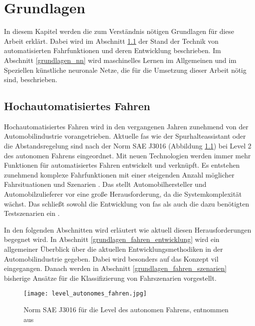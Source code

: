 
\chapter{Grundlagen}
\label{grundlagen}

In diesem Kapitel werden die zum Verständnis nötigen Grundlagen für diese Arbeit erklärt. Dabei wird im Abschnitt \ref{grundlagen_fahren} der Stand der Technik von automatisierten Fahrfunktionen und deren Entwicklung beschrieben. Im Abschnitt \ref{grundlagen_nn} wird maschinelles Lernen im Allgemeinen und im Speziellen künstliche neuronale Netze, die für die Umsetzung dieser Arbeit nötig sind, beschrieben.


\section{Hochautomatisiertes Fahren}
\label{grundlagen_fahren}

Hochautomatisiertes Fahren wird in den vergangenen Jahren zunehmend von der Automobilindustrie vorangetrieben. Aktuelle \gls{fas} wie der Spurhalteassistant oder die Abstandsregelung sind nach der Norm SAE J3016 (Abbildung \ref{fig_level_autonomes_fahren}) bei Level 2 des autonomen Fahrens eingeordnet. Mit neuen Technologien werden immer mehr Funktionen für automatisiertes Fahren entwickelt und verknüpft. Es entstehen zunehmend komplexe Fahrfunktionen mit einer steigenden Anzahl möglicher Fahrsituationen und Szenarien \cite{king2017identification}. Das stellt Automobilhersteller und Automobilzulieferer vor eine große Herausforderung, da die Systemkomplexität wächst. Das schließt sowohl die Entwicklung von \gls{fas} als auch die dazu benötigten Testszenarien ein \cite{pfeffer2016continuous}.

In den folgenden Abschnitten wird erläutert wie aktuell diesen Herausforderungen begegnet wird. In Abschnitt \ref{grundlagen_fahren_entwicklung} wird ein allgemeiner Überblick über die aktuellen Entwicklungsmethodiken in der Automobilindustrie gegeben. Dabei wird besonders auf das Konzept \gls{vil} eingegangen. Danach werden in Abschnitt \ref{grundlagen_fahren_szenarien} bisherige Ansätze für die Klassifizierung von Fahrszenarien vorgestellt.

\begin{figure}[h]
\centering
\texttt{[image: level\_autonomes\_fahren.jpg]}
\caption{Norm SAE J3016 für die Level des autonomen Fahrens, entnommen aus \cite{sae2014taxonomy}}
\label{fig_level_autonomes_fahren}
\end{figure}


